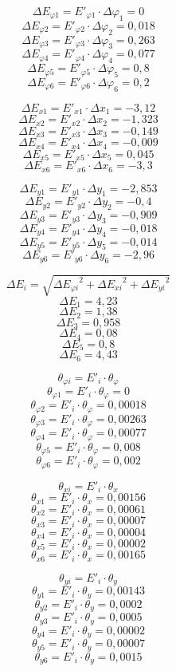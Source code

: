\documentclass[a4paper,12pt]{report}
\begin{document}
\[ \Delta E_{\varphi 1} = E'_{\varphi 1}\cdot \Delta{\varphi}_1 = 0\]  
\[ \Delta E_{\varphi 2} = E'_{\varphi 2}\cdot \Delta{\varphi}_2 = 0,018\]  
\[ \Delta E_{\varphi 3} = E'_{\varphi 3}\cdot \Delta{\varphi}_3 = 0,263\]  
\[ \Delta E_{\varphi 4} = E'_{\varphi 4}\cdot \Delta{\varphi}_4 = 0,077\]  
\[ \Delta E_{\varphi 5} = E'_{\varphi 5}\cdot \Delta{\varphi}_5 = 0,8\]  
\[ \Delta E_{\varphi 6} = E'_{\varphi 6}\cdot \Delta{\varphi}_6 = 0,2\]

\[ \Delta E_{x 1} = E'_{x 1}\cdot \Delta{x}_1 = -3,12\]  
\[ \Delta E_{x 2} = E'_{x 2}\cdot \Delta{x}_2 = -1,323\]  
\[ \Delta E_{x 3} = E'_{x 3}\cdot \Delta{x}_3 = -0,149\]  
\[ \Delta E_{x 4} = E'_{x 4}\cdot \Delta{x}_4 = -0,009\]  
\[ \Delta E_{x 5} = E'_{x 5}\cdot \Delta{x}_5 = 0,045\]
\[ \Delta E_{x 6} = E'_{x 6}\cdot \Delta{x}_6 = -3,3\]  

\[ \Delta E_{y 1} = E'_{y 1}\cdot \Delta{y}_1 = -2,853\]  
\[ \Delta E_{y 2} = E'_{y 2}\cdot \Delta{y}_2 = -0,4\]  
\[ \Delta E_{y 3} = E'_{y 3}\cdot \Delta{y}_3 = -0,909\]  
\[ \Delta E_{y 4} = E'_{y 4}\cdot \Delta{y}_4 = -0,018\]  
\[ \Delta E_{y 5} = E'_{y 5}\cdot \Delta{y}_5 = -0,014\]  
\[ \Delta E_{y 6} = E'_{y 6}\cdot \Delta{y}_6 = -2,96\]

\[ \Delta E_i = \sqrt{{{\Delta E_{\varphi i}}}^2 + {{\Delta E_{x i}}}^2 + {{\Delta E_{y i}}}^2} \]
\[ \Delta E_1 = 4,23\]
\[ \Delta E_2 = 1,38\]
\[ \Delta E_3 = 0,958\]
\[ \Delta E_4 = 0,08\]
\[ \Delta E_5 = 0,8\]
\[ \Delta E_6 = 4,43\]

\[ \theta_{\varphi i} = E'_i \cdot \theta_{\varphi} \]
\[ \theta_{\varphi 1} = E'_i \cdot \theta_{\varphi} = 0\]
\[ \theta_{\varphi 2} = E'_i \cdot \theta_{\varphi} = 0,00018\]
\[ \theta_{\varphi 3} = E'_i \cdot \theta_{\varphi} = 0,00263\]
\[ \theta_{\varphi 4} = E'_i \cdot \theta_{\varphi} = 0,00077\]
\[ \theta_{\varphi 5} = E'_i \cdot \theta_{\varphi} = 0,008\]
\[ \theta_{\varphi 6} = E'_i \cdot \theta_{\varphi} = 0,002\]

\[ \theta_{xi} = E'_i \cdot \theta_{x}\]
\[ \theta_{x1} = E'_i \cdot \theta_{x} = 0,00156\]
\[ \theta_{x2} = E'_i \cdot \theta_{x} = 0,00061\]
\[ \theta_{x3} = E'_i \cdot \theta_{x} = 0,00007\]
\[ \theta_{x4} = E'_i \cdot \theta_{x} = 0,00004\]
\[ \theta_{x5} = E'_i \cdot \theta_{x} = 0,00002\]
\[ \theta_{x6} = E'_i \cdot \theta_{x} = 0,00165\]

\[ \theta_{yi} = E'_i \cdot \theta_{y}\]
\[ \theta_{y1} = E'_i \cdot \theta_{y} = 0,00143\]
\[ \theta_{y2} = E'_i \cdot \theta_{y} = 0,0002\]
\[ \theta_{y3} = E'_i \cdot \theta_{y} = 0,0005\]
\[ \theta_{y4} = E'_i \cdot \theta_{y} = 0,00002\]
\[ \theta_{y5} = E'_i \cdot \theta_{y} = 0,00007\]
\[ \theta_{y6} = E'_i \cdot \theta_{y} = 0,0015\]
\end{document}

